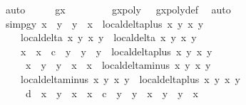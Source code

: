 \begin{isabellebody}
\ auto\isanewline
\ \ \isamarkupfalse%
\ \isamarkupfalse%
\ {\isachardoublequoteopen}g\isactrlsub x\ {\isacharequal}\ {}{\isachardoublequoteclose}\ \isanewline
\ \ \ \ \isamarkupfalse%
\ {\isacartoucheopen}gxpoly\ {\isacharequal}\ {}{\isacartoucheclose}\ gxpoly{\isacharunderscore}def\ \isamarkupfalse%
\ auto\isanewline
\isanewline
\ \ \isamarkupfalse%
\ simp{}gy{\isacharcolon}\ {\isachardoublequoteopen}{\isacharparenleft}x{}{\isacharprime}\ {\isacharasterisk}\ y{}\ {\isacharplus}\ y{}{\isacharprime}\ {\isacharasterisk}\ x{}{\isacharparenright}\ {\isacharasterisk}\ local{\isachardot}delta{\isacharunderscore}plus\ x{}\ y{}\ x{}{\isacharprime}\ y{}{\isacharprime}\ {\isacharasterisk}\isanewline
\ \ \ \ {\isacharparenleft}local{\isachardot}delta\ x{}\ y{}\ x{}\ y{}\ {\isacharasterisk}\ local{\isachardot}delta\ x{}\ y{}\ x{}\ y{}{\isacharparenright}\ {\isacharequal}\ \isanewline
\ \ \ \ {\isacharparenleft}{\isacharparenleft}x{}\ {\isacharasterisk}\ x{}\ {\isacharminus}\ c\ {\isacharasterisk}\ y{}\ {\isacharasterisk}\ y{}{\isacharparenright}\ {\isacharasterisk}\ y{}\ {\isacharasterisk}\ local{\isachardot}delta{\isacharunderscore}plus\ x{}\ y{}\ x{}\ y{}\ {\isacharplus}\isanewline
\ \ \ \ \ {\isacharparenleft}x{}\ {\isacharasterisk}\ y{}\ {\isacharplus}\ y{}\ {\isacharasterisk}\ x{}{\isacharparenright}\ {\isacharasterisk}\ x{}\ {\isacharasterisk}\ local{\isachardot}delta{\isacharunderscore}minus\ x{}\ y{}\ x{}\ y{}{\isacharparenright}\ {\isacharasterisk}\isanewline
\ \ \ \ {\isacharparenleft}local{\isachardot}delta{\isacharunderscore}minus\ x{}\ y{}\ x{}\ y{}\ {\isacharasterisk}\ local{\isachardot}delta{\isacharunderscore}plus\ x{}\ y{}\ x{}\ y{}\ {\isacharplus}\isanewline
\ \ \ \ \ d\ {\isacharasterisk}\ x{}\ {\isacharasterisk}\ y{}\ {\isacharasterisk}\ {\isacharparenleft}x{}\ {\isacharasterisk}\ x{}\ {\isacharminus}\ c\ {\isacharasterisk}\ y{}\ {\isacharasterisk}\ y{}{\isacharparenright}\ {\isacharasterisk}\ {\isacharparenleft}x{}\ {\isacharasterisk}\ y{}\ {\isacharplus}\ y{}\ {\isacharasterisk}\ x{}{\isacharparenright}{\isacharparenright}{\isachardoublequoteclose}\isanewline

\end{isabellebody}
